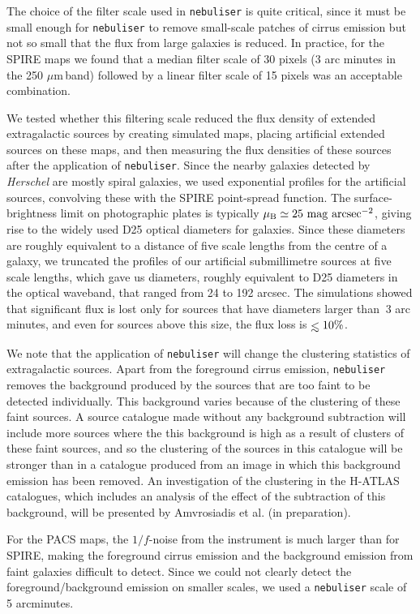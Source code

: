\documentclass[useAMS,usenatbib]{mn2e}
\def\lesssim{\mathrel{\hbox{\rlap{\hbox{\lower4pt\hbox{$\sim$}}}\hbox{$<$}}}}
\def\mic{ $\mu $m\,}
\begin{document}
The
choice of the filter scale
used in {\tt nebuliser} is quite critical, since
it  must be small enough for {\tt nebuliser} to remove
small-scale patches of cirrus emission
but not so small that the flux from large galaxies is reduced.
In practice, 
for the SPIRE maps we found that a median filter scale of 30 pixels (3
arc minutes in the 250 \mic band) followed by a linear filter scale of
15 pixels was an acceptable combination. 

We tested 
whether this filtering scale reduced the flux density of extended extragalactic
sources
by creating
simulated maps, placing artificial extended sources on these maps, and then
measuring the flux densities of these sources
after the application of
{\tt nebuliser}. 
Since the nearby galaxies detected by {\it Herschel} are mostly
spiral galaxies,
we used exponential profiles for the artificial sources, convolving
these with the
SPIRE point-spread function.
The surface-brightness limit on photographic plates
is typically
$\rm \mu_B \simeq 25\ mag\ arcsec^{-2}$, giving rise
to the widely used D25 optical diameters for galaxies.
Since these diameters are roughly equivalent to a distance of five scale
lengths from the centre of a galaxy, we truncated the profiles
of our artificial submillimetre sources at five scale lengths,
which gave us diameters, roughly equivalent to D25 diameters in the optical
waveband, that ranged from
24 to 192 arcsec.
The simulations showed that significant flux is lost only for
sources that have diameters larger than $~3$ arc minutes, and even for
sources above this size,
the flux loss is $\lesssim 10\%$.

We note that the application of {\tt nebuliser} will change
the clustering statistics of extragalactic sources.
Apart from the foreground cirrus emission, {\tt nebuliser} removes
the background produced by the sources that are too faint to be detected
individually. This background varies because of the clustering of these
faint sources.
A source catalogue made
without any background subtraction will include more sources where the
this background is high as a result of clusters of these faint sources, and so
the clustering of the sources in this catalogue will be stronger than in
a catalogue produced from an image in which this background emission has been
removed. An investigation of the clustering in the H-ATLAS catalogues,
which includes an analysis of the effect of the subtraction of this
background, will be presented by Amvrosiadis et al. (in preparation).

For the PACS maps, the $1/f$-noise from the instrument is much larger than
for SPIRE, making the foreground cirrus emission and the background
emission from faint galaxies difficult to detect. Since we could not
clearly detect the foreground/background emission on smaller
scales, we used a {\tt nebuliser} scale of 5 arcminutes.
\end{document}
